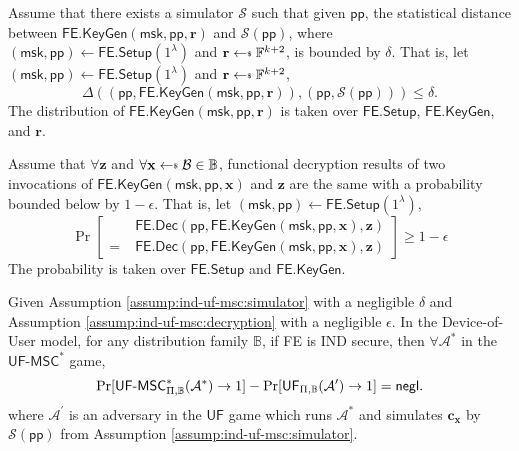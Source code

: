 \begin{assumption}
\label{assump:ind-uf-msc:simulator}
	Assume that there exists a simulator $\mathcal{S}$ such that given $\textsf{pp}$, the statistical distance between $\textsf{FE.KeyGen}(\textsf{msk}, \textsf{pp}, \mathbf{r})$ and $\mathcal{S}(\textsf{pp})$, where $(\textsf{msk}, \textsf{pp}) \gets \textsf{FE.Setup}(1^\lambda)$ and $\mathbf{r} \getsdollar \mathbb{F}^{k+2}$, is bounded by $\delta$.
	That is, let $(\textsf{msk}, \textsf{pp}) \gets \textsf{FE.Setup}(1^\lambda)$ and $\mathbf{r} \getsdollar \mathbb{F}^{k+2}$,
	\[
		\Delta \left( (\textsf{pp}, \textsf{FE.KeyGen}(\textsf{msk}, \textsf{pp}, \mathbf{r})), (\textsf{pp}, \mathcal{S}(\textsf{pp}) ) \right) \leq \delta.
	\]
	The distribution of $\textsf{FE.KeyGen}(\textsf{msk}, \textsf{pp}, \mathbf{r})$ is taken over $\textsf{FE.Setup}$, $\textsf{FE.KeyGen}$, and $\mathbf{r}$.

\end{assumption}


\begin{assumption}
\label{assump:ind-uf-msc:decryption}
	Assume that $\forall \mathbf{z}$ and $\forall \mathbf{x} \getsdollar \mathcal{B} \in \mathbb{B}$, functional decryption results of two invocations of $\textsf{FE.KeyGen}( \textsf{msk}, \textsf{pp}, \mathbf{x})$ and $\mathbf{z}$ are the same with a probability bounded below by $1 - \epsilon$.
	That is, let $(\textsf{msk}, \textsf{pp}) \gets \textsf{FE.Setup}(1^\lambda)$,
\[
	\Pr \left[
		\begin{aligned}
			& \textsf{FE.Dec}(\textsf{pp}, \textsf{FE.KeyGen}( \textsf{msk}, \textsf{pp}, \mathbf{x}), \mathbf{z}) \\
		  =\; & \textsf{FE.Dec}(\textsf{pp}, \textsf{FE.KeyGen}( \textsf{msk}, \textsf{pp}, \mathbf{x}), \mathbf{z})
		\end{aligned}
	\right] \geq 1 - \epsilon
\]
	The probability is taken over $\textsf{FE.Setup}$ and $\textsf{FE.KeyGen}$.

\end{assumption}


\begin{theorem}
\label{thm:ind-uf-msc2}

Given Assumption \ref{assump:ind-uf-msc:simulator} with a negligible $\delta$ and Assumption \ref{assump:ind-uf-msc:decryption} with a negligible $\epsilon$.
In the Device-of-User model, for any distribution family $\mathbb{B}$, if \textsf{FE} is IND secure, then $\forall \mathcal{A}^*$ in the $\textsf{UF-MSC}^*$ game,
\[
	\Pr[\textsf{UF-MSC}^*_{\Pi, \mathbb{B}}(\mathcal{A}^*) \to 1] - \Pr[\textsf{UF}_{\Pi, \mathbb{B}}(\mathcal{A}^\prime) \to 1] = \mathsf{negl}.
\]
where $\mathcal{A}^\prime$ is an adversary in the $\textsf{UF}$ game which runs $\mathcal{A}^*$ and simulates $\mathbf{c_x}$ by $\mathcal{S}(\textsf{pp})$ from Assumption \ref{assump:ind-uf-msc:simulator}.
\end{theorem}


